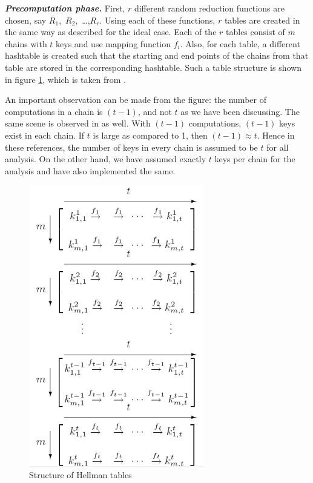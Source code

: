 \noindent \textit{\textbf{Precomputation phase.}} First, $r$ different random reduction functions are chosen, say \mbox{$R_1$, $R_2$, \ldots ,$R_r$}. Using each of these functions, $r$ tables are created in the same way as described for the ideal case. Each of the $r$ tables consist of $m$ chains with $t$ keys and use mapping function $f_i$. Also, for each table, a different hashtable is created such that the starting and end points of the chains from that table are stored in the corresponding hashtable. Such a table structure is shown in figure \ref{fig:hellman-tables}, which is taken from \cite{oechslin:mfc}.

An important observation can be made from the figure: the number of computations in a chain is $(t-1)$, and not $t$ as we have been discussing. The same scene is observed in \cite{stamp2007acb} as well. With $(t-1)$ computations, $(t-1)$ keys exist in each chain. If $t$ is large as compared to 1, then $(t-1) \approx t$. Hence in these references, the number of keys in every chain is assumed to be $t$ for all analysis. On the other hand, we have assumed exactly $t$ keys per chain for the analysis and have also implemented the same.

\begin{figure}[ht!]
	\centering
		\includegraphics[width=3in]{./figures/hellman-tables.PNG}
	\caption{Structure of Hellman tables \cite{oechslin:mfc}}	
	\label{fig:hellman-tables}
\end{figure}

